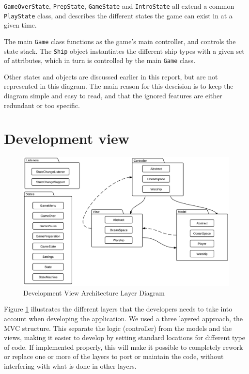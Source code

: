 \texttt{GameOverState}, \texttt{PrepState}, \texttt{GameState} and \texttt{IntroState} all extend a common \texttt{PlayState} class, and describes the different states the game can exist in at a given time.

The main \texttt{Game} class functions as the game's main controller, and controls the state stack. The \texttt{Ship} object instantiates the different ship types with a given set of attributes, which in turn is controlled by the main \texttt{Game} class.

Other states and objects are discussed earlier in this report, but are not represented in this diagram. The main reason for this descision is to keep the diagram simple and easy to read, and that the ignored features are either redundant or too specific.



\section{Development view}


\begin{figure}[ht]
    \includegraphics[scale=0.65]{img/PackageDiagram.png}
    \caption{Development View Architecture Layer Diagram}
    \label{fig:DevelopmentView}
\end{figure}

Figure \ref{fig:DevelopmentView} illustrates the different layers that the developers needs to take into account when developing the application. We used a three layered approach, the MVC structure. This separate the logic (controller) from the models and the views, making it easier to develop by setting standard locations for different type of code. If implemented properly, this will make it possible to completely rework or replace one or more of the layers to port or maintain the code, without interfering with what is done in other layers.

